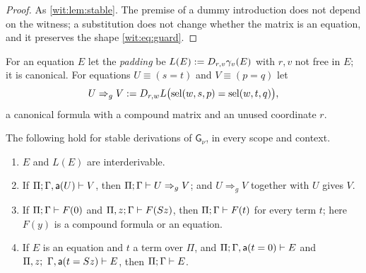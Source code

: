 \begin{proof}
As \cref{wit:lem:stable}.  The premise of a dummy introduction does not
depend on the witness; a substitution does not change whether the matrix is
an equation, and it preserves the shape \eqref{wit:eq:guard}.
\end{proof}

For an equation $E$ let the \emph{padding} be
$L(E)\mathrel{:=}D_{r,v}\gamma_v(E)$ with $r,v$ not free in $E$; it is canonical.
For equations $U\equiv(s=t)$ and $V\equiv(p=q)$ let
\[
 U\Rightarrow_{g}V\mathrel{:=}D_{r,w}L\bigl(\operatorname{sel}(w,s,p)=\operatorname{sel}(w,t,q)\bigr),
\]
a canonical formula with a compound matrix and an unused coordinate $r$.

\begin{lemma}
\label{wit:lem:guarded-tools}
The following hold for stable derivations of $\mathsf{G}_{\nu}$, in every
scope and context.
\begin{enumerate}[label=\textup{(\roman*)}]
\item $E$ and $L(E)$ are interderivable.
\item If $\Pi;\Gamma,\mathsf{a}(U)\vdash V$, then
 $\Pi;\Gamma\vdash U\Rightarrow_{g}V$; and $U\Rightarrow_{g}V$ together
 with $U$ gives $V$.
\item If $\Pi;\Gamma\vdash F(0)$ and $\Pi,z;\Gamma\vdash F(S z)$,
 then $\Pi;\Gamma\vdash F(t)$ for every term $t$; here $F(y)$ is a
 compound formula or an equation.
\item If $E$ is an equation and $t$ a term over $\Pi$, and
 $\Pi;\Gamma,\mathsf{a}(t=0)\vdash E$ and
 $\Pi,z;\ \Gamma,\mathsf{a}(t=\Suc z)\proves E$, then
 $\Pi;\Gamma\vdash E$.
\end{enumerate}
\end{lemma}

